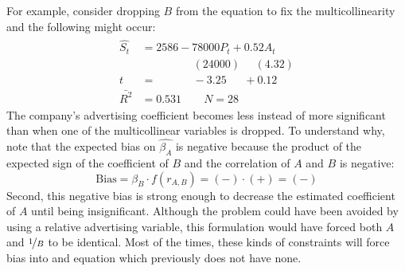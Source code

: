 \documentclass[11pt]{article}
\begin{document}
For example, consider dropping $B$ from the equation to fix the multicollinearity and the following might occur:
\begin{align}
\label{eg8_20}
\begin{split}
\hat{S_t} &= 2586 - {78000P_t} + {0.52A_t} \\
&\>\>\>\>\>\>\>\>\>\>\>\>\>\>\>\>\>\>\>\>\> (24000) 
\>\>\>\>\>\> (4.32)\\
t&=\>\>\>\>\>\>\>\>\>\>\>\>\>\>\> -3.25 
\>\>\>\>\>\>\> +0.12\\
\bar{R^2}&= 0.531 \quad\quad N=28
\end{split}
\end{align}
The company's advertising coefficient becomes less instead of more significant than when one of the multicollinear variables is dropped. To understand why, note that the expected bias on $\hat{\beta_A}$ is negative because the product of the expected sign of the coefficient of $B$ and the correlation of $A$ and $B$ is negative:
\begin{equation}
\text{Bias} = \beta_B \cdot f(r_{A,B}) = (-) \cdot (+) = (-)
\label{eg8_21}
\end{equation}
Second, this negative bias is strong enough to decrease the estimated coefficient of $A$ until being insignificant. Although the problem could have been avoided by using a relative advertising variable, this formulation would have forced both $A$ and $\nicefrac 1B$ to be identical. Most of the times, these kinds of constraints will force bias into and equation which previously does not have none.
\end{document}

